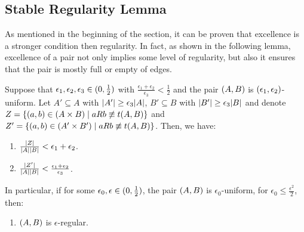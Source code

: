 
    \subsection{Stable Regularity Lemma} \label{subsec:subsection_5.3}

        As mentioned in the beginning of the section, it can be proven that excellence is a stronger condition then
        regularity.
        In fact, as shown in the following lemma, excellence of a pair not only implies some level of regularity, but
        also it ensures that the pair is mostly full or empty of edges.

        \begin{lemma}[Lemma 5.17] \label{lem:excellence_implies_regularity}
            Suppose that $\epsilon_1, \epsilon_2, \epsilon_3 \in ( 0, \frac{1}{2} )$ with
            $\frac{\epsilon_1 + \epsilon_2}{\epsilon_3} < \frac{1}{2}$ and the pair $( A,B )$ is
            $( \epsilon_1, \epsilon_2 )$-uniform.
            Let $A' \subseteq A$ with $| A' | \geq \epsilon_3 | A |$,
            $B' \subseteq B$ with $| B' | \geq \epsilon_3 | B |$ and
            denote $Z = \{ ( a,b ) \in ( A \times B ) \mid a R b \not\equiv t( A,B ) \}$ and
            $Z' = \{ ( a,b ) \in ( A' \times B' ) \mid a R b \not\equiv t( A,B ) \}$.
            Then, we have:
            \begin{enumerate}
                \item \label{itm:excellence_implies_regularity.1} $\frac{| Z |}{{| A | | B |}} < \epsilon_1 + \epsilon_2$.
                \item \label{itm:excellence_implies_regularity.2} $\frac{| Z' |}{| A | | B |} <
                    \frac{\epsilon_1 + \epsilon_2}{\epsilon_3}$.
            \end{enumerate}
            In particular, if for some $\epsilon_0, \epsilon \in ( 0, \frac{1}{2} )$, the pair
            $( A,B )$ is $\epsilon_0$-uniform, for $\epsilon_0 \leq \frac{\epsilon^2}{2}$, then:
            \begin{enumerate}[label=\alph*., ref=\alph*]
                \item \label{itm:excellence_implies_regularity.a} $( A,B )$ is $\epsilon$-regular.

\end{enumerate}
\end{lemma}
